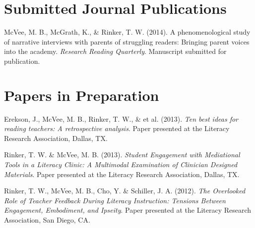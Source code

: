 

\section{Submitted Journal Publications}
\vspace{-.1275in}
\begin{bibsection}
    \item McVee, M. B., McGrath, K., \& Rinker, T. W. (2014). A phenomenological study of narrative interviews with parents of struggling readers: Bringing parent voices into the academy. \emph{Research Reading Quarterly}. Manuscript submitted for publication.
\end{bibsection}


\halfblankline

\section{Papers in Preparation}
\vspace{-.1in}
\begin{bibsection}

\item Erekson, J., McVee, M. B., Rinker, T. W., \& et al. (2013). \emph{Ten best ideas for reading teachers: A retrospective analysis}. Paper presented at the Literacy Research Association, Dallas, TX.

\item Rinker, T. W. \& McVee, M. B. (2013).  \emph{Student Engagement with Mediational Tools in a Literacy Clinic: A Multimodal Examination of Clinician Designed Materials}.  Paper presented at the Literacy Research Association, Dallas, TX.

\item Rinker, T. W., McVee, M. B., Cho, Y. \& Schiller, J. A. (2012).  \emph{The Overlooked Role of Teacher Feedback During Literacy Instruction: Tensions Between Engagement, Embodiment, and Ipseity}.  Paper presented at the Literacy Research Association, San Diego, CA.



\end{bibsection}

